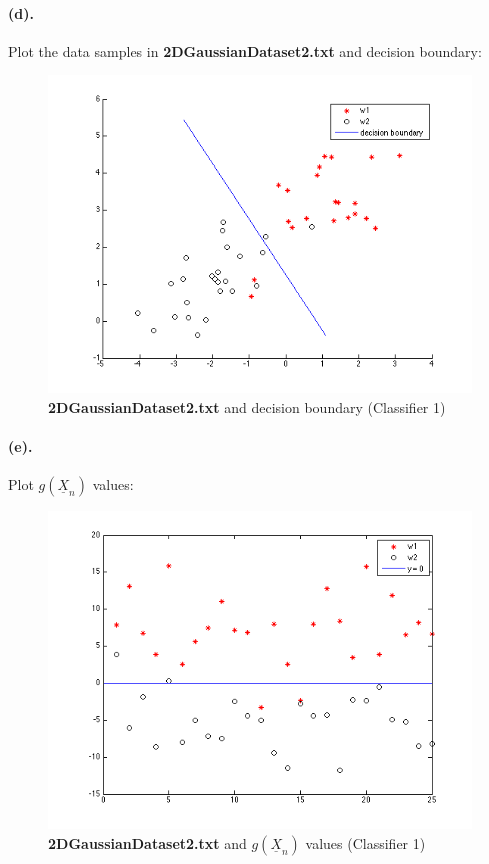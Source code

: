 \documentclass[a4paper]{article}
\begin{document}
\paragraph{(d).} Plot the data samples in \textbf{2DGaussianDataset2.txt} and decision boundary: \\
\begin{figure}[H]
  \centering
    \includegraphics[scale=.6]{images/2_d.png}
  \caption{\textbf{2DGaussianDataset2.txt} and decision boundary (Classifier 1)}
\end{figure}

\paragraph{(e).} Plot $g(\underline{X}_{n})$ values: \\
\begin{figure}[H]
  \centering
    \includegraphics[scale=.6]{images/2_e.png}
  \caption{\textbf{2DGaussianDataset2.txt} and $g(\underline{X}_{n})$ values (Classifier 1)}
\end{figure}
\end{document}
